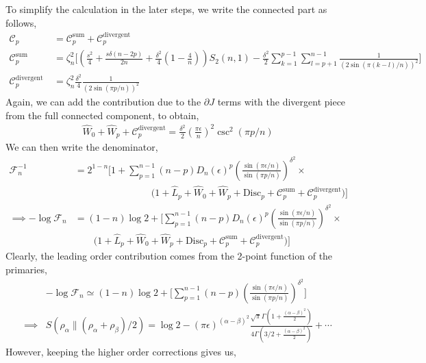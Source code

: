 \documentclass[11pt]{article}
\newcommand{\ep}{\epsilon}
\newcommand{\p}{\partial}
\newcommand{\nn}{\nonumber}
\newcommand{\lb}{\left(}
\newcommand{\rb}{\right)}
\begin{document}
To simplify the calculation in the later steps, we write the connected part as follows,
\begin{align}
\mathcal{C}_p&=\mathcal{C}_p^{\text{sum}} + \mathcal{C}_p^{\text{divergent }} \\
\mathcal{C}_p^{\text{sum}} &= \zeta_n^2 \Bigg[ \lb\frac{s^2}{4} + \frac{s\delta (n-2p)}{2n} + \frac{\delta^2}{4}\lb1-\frac{4}{n}\rb\rb S_2(n,1)- \frac{\delta^2}{2}\sum_{k=1}^{p-1}\sum_{l=p+1}^{n-1}\frac{1}{\lb2\sin(\pi(k-l)/n)\rb^2}\Bigg]
\\
\mathcal{C}_p^{\text{divergent }} &= \zeta_n^2  \frac{\delta^2}{4}\frac{1}{\lb2\sin(\pi p/n)\rb^2}
\end{align}
Again, we can add the contribution due to the $\p J$ terms with the divergent piece from the full connected component, to obtain,
\begin{align}
    \hat{W}_0 + \hat{W}_p + \mathcal{C}_p^{\text{divergent}} = \frac{\delta^2}{2}\lb \frac{\pi \ep}{n} \rb^2 \csc^2 (\pi p/n)
\end{align}
We can then write the denominator,
\begin{align}
    \mathcal{F}_n^{-1}&=2^{1-n} \Bigg[ 1 + \sum_{p=1}^{n-1}(n-p)D_n(\ep)^p \lb\frac{\sin(\pi \ep/n)}{\sin (\pi p/n)}\rb^{\delta^2} \times \nn\\
    &\qquad \qquad \qquad \qquad \Big( 1 + \hat{L}_p + \hat{W}_0 + \hat{W}_p + \text{Disc}_p + \mathcal{C}_p^{\text{sum}} + \mathcal{C}_p^{\text{divergent}} \Big)\Bigg] \\
    \implies  -\log \mathcal{F}_n &= (1-n)\log 2 + \Bigg[\sum_{p=1}^{n-1}(n-p)D_n(\ep)^p \lb\frac{\sin(\pi \ep/n)}{\sin (\pi p/n)}\rb^{\delta^2} \times\nn \\
    &\qquad \Big( 1 + \hat{L}_p + \hat{W}_0 + \hat{W}_p + \text{Disc}_p + \mathcal{C}_p^{\text{sum}} + \mathcal{C}_p^{\text{divergent}} \Big)\Bigg]
\end{align}
Clearly, the leading order contribution comes from the 2-point function of the primaries, 
\begin{align}
    &-\log \mathcal{F}_n \simeq (1-n)\log 2 + \Bigg[\sum_{p=1}^{n-1}(n-p) \lb\frac{\sin(\pi \ep/n)}{\sin (\pi p/n)}\rb^{\delta^2} \Bigg]
    \\
    \implies &S(\rho_\alpha \| (\rho_\alpha + \rho_\beta)/2) = \log 2 - (\pi \ep)^{(\alpha - \beta)^2} \frac{\sqrt{\pi }\Gamma\lb1+ \frac{(\alpha - \beta)^2}{2} \rb}{4\Gamma\lb3/2 + \frac{(\alpha - \beta)^2}{2}\rb }+ \cdots 
\end{align}
However, keeping the higher order corrections gives us,
\end{document}
